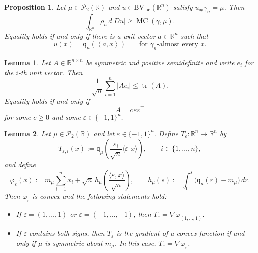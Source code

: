 \documentclass[10pt,a4paper]{amsart}
\newtheorem{lemma}{Lemma}
\newtheorem{proposition}{Proposition}
\newcommand{\BVloc}{\operatorname{BV_{loc}}}
\newcommand{\MC}{\operatorname{MC}}
\newcommand{\Pcal}{\mathcal{P}}
\newcommand{\R}{\mathbb{R}}
\newcommand{\ip}[2]{\left\langle #1,#2\right\rangle}
\newcommand{\qmu}{\mathsf q_{\mu}}
\begin{document}
\begin{proposition}\label{prop:ineq_component}
Let $\mu \in \Pcal_2(\R)$ and $u\in \BVloc(\R^n)$ satisfy
$u_\#\gamma_n=\mu$. Then
\begin{equation}\label{eq:scalar-bound}
  \int_{\R^n} \rho_n \,  d|Du| \ge \MC(\gamma,\mu).
\end{equation}
Equality holds if and only if there is a
unit vector $a\in\R^n$ such that
\begin{equation}\label{eq:scalar-equality}
  u(x)=\qmu(\ip{a}{x})
  \qquad\text{for $\gamma_n$-almost every $x$.}
\end{equation}
\end{proposition}

\begin{lemma}\label{lem:matrix}
Let $A\in\mathbb R^{n\times n}$ be symmetric and positive semidefinite
and write $e_i$ for the $i$-th unit vector. Then
\[
  \frac{1}{\sqrt n}\sum_{i=1}^n |Ae_i|
  \leq
  \operatorname{tr}(A).
\]
Equality holds if and only if
\[
  A=c\,\varepsilon\varepsilon^\top
\]
for some $c\geq0$ and some $\varepsilon\in\{-1,1\}^n$.
\end{lemma}

\begin{lemma}\label{lem:signed-gradient}
Let $\mu\in\Pcal_2(\R)$ and let
$\varepsilon\in\{-1,1\}^n$. Define
$T_\varepsilon\colon\R^n\to\R^n$ by
\[
  T_{\varepsilon,i}(x)
  :=
  \qmu\left(
    \frac{\varepsilon_i}{\sqrt n}
    \langle\varepsilon,x\rangle
  \right),
  \qquad i\in\{1,\ldots,n\},
\]
and define 
\[
  \varphi_\varepsilon(x)
  :=
  m_\mu\sum_{i=1}^n x_i
  +
  \sqrt n\,h_\mu\left(
    \frac{\langle\varepsilon,x\rangle}{\sqrt n}
  \right),
  \qquad
  h_\mu(s)
  :=
  \int_0^s\bigl(\qmu(r)-m_\mu\bigr)\,dr.
\]
Then $\varphi_\varepsilon$ is convex and the following statements hold:
\begin{itemize}
    \item If $\varepsilon=(1,\ldots,1)$ or $\varepsilon=(-1,\ldots,-1)$, then $T_\varepsilon=\nabla\varphi_{(1,\ldots,1)}$.
    \item If $\varepsilon$ contains both signs, then $T_\varepsilon$ is the
gradient of a convex function if and only if $\mu$ is symmetric about
$m_\mu$. In this case, $T_\varepsilon=\nabla\varphi_\varepsilon$.
\end{itemize}
\end{lemma}
\end{document}
